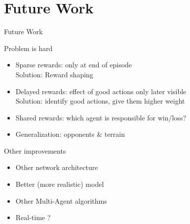 \documentclass{beamer}
\begin{document}
\section{Future Work}
\begin{frame}{Future Work}
\begin{block}{Problem is hard}
    \begin{itemize}
        \item \alert{Sparse rewards}: only at end of episode\\
               Solution: Reward shaping
        \pause
        \item \alert{Delayed rewards}: effect of good actions only later visible\\
              Solution: identify good actions, give them higher weight
        \pause
        \item \alert{Shared rewards}: which agent is responsible for win/loss?
        \pause
        \item \alert{Generalization}: opponents \& terrain
    \end{itemize}
\end{block}
    \pause
\begin{block}{Other improvements}
    \begin{itemize}
        \item Other network architecture
        \item Better (more realistic) model
        \item Other Multi-Agent algorithms
        \item Real-time ?
    \end{itemize}
\end{block}
\end{frame}
\end{document}
